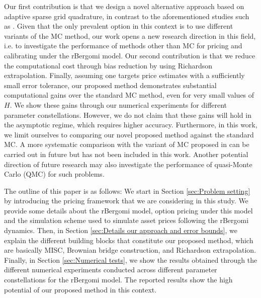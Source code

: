Our first contribution is that we design a novel alternative approach based on adaptive sparse grid quadrature, in contrast to the aforementioned studies such as \cite{mccrickerd2018turbocharging}. Given that the only prevalent option in this context is to use different variants of the MC method, our work opens a new  research direction in this field, i.e.  to investigate the performance of methods other than MC for pricing and calibrating under the rBergomi model. Our second contribution is that we reduce the computational cost  through bias reduction by using Richardson extrapolation. Finally, assuming one targets price estimates with a sufficiently small  error tolerance, our proposed method demonstrates substantial computational gains  over the standard MC method, even for very small values of  $H$. We show  these gains through our numerical experiments for  different parameter constellations. However, we do not claim that these gains will hold in the asymptotic regime, which requires higher accuracy. Furthermore,  in this work, we limit ourselves to comparing our novel proposed method against the standard MC. A more systematic comparison with the variant of MC proposed in \cite{mccrickerd2018turbocharging}  can be carried out in future but has not been included in this work. Another potential direction of future research may also investigate the performance of quasi-Monte Carlo (QMC) for such problems.


The outline of this paper is as follows: We start in Section \ref{sec:Problem setting} by  introducing  the pricing framework that we are considering in this study. We provide some details about the rBergomi model, option pricing under this model and the simulation scheme used to simulate asset prices following the rBergomi dynamics. Then, in Section \ref{sec:Details our approach and error bounds}, we explain the different building blocks that constitute our proposed method, which are basically MISC, Brownian bridge construction, and Richardson extrapolation. Finally, in Section \ref{sec:Numerical tests}, we show the results obtained through the different numerical experiments conducted across different parameter constellations for the rBergomi model. The reported results show the high potential of our proposed method in this context.


